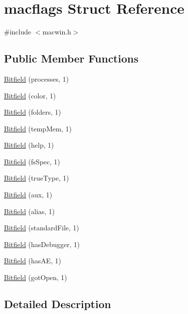 \hypertarget{structmacflags}{\section{macflags Struct Reference}
\label{structmacflags}
}


{\ttfamily \#include $<$macwin.\+h$>$}

\subsection*{Public Member Functions}
\begin{DoxyCompactItemize}
\item 
\hyperlink{structmacflags_a492419e327187a35b685884fd35328bf}{Bitfield} (processes, 1)
\item 
\hyperlink{structmacflags_aa684f1c09cbb235a1252605e7e7455a5}{Bitfield} (color, 1)
\item 
\hyperlink{structmacflags_a704edd2ff63044bccd74392acb1597be}{Bitfield} (folders, 1)
\item 
\hyperlink{structmacflags_acef38b6901759fbbf9a41293096646ca}{Bitfield} (temp\+Mem, 1)
\item 
\hyperlink{structmacflags_ab07089909177f8fc65cb9d87e2c2e085}{Bitfield} (help, 1)
\item 
\hyperlink{structmacflags_a3ef18db3586d2b2d469f1fecd22b5fb1}{Bitfield} (fs\+Spec, 1)
\item 
\hyperlink{structmacflags_ad75aa422c63698f2ca13e5ea43c5bcda}{Bitfield} (true\+Type, 1)
\item 
\hyperlink{structmacflags_ab5cc796c60ccca4386aa88e43ceb62c0}{Bitfield} (aux, 1)
\item 
\hyperlink{structmacflags_a6bb87dc6ce6393dc5c2ee2ad863ed21b}{Bitfield} (alias, 1)
\item 
\hyperlink{structmacflags_a9737f8f2dd606aa94f7575e2cad03d27}{Bitfield} (standard\+File, 1)
\item 
\hyperlink{structmacflags_ac66bb5f10857e0fbd006fffa1b7d30b2}{Bitfield} (has\+Debugger, 1)
\item 
\hyperlink{structmacflags_a65986d24bfedf19e0a515a9698056703}{Bitfield} (has\+A\+E, 1)
\item 
\hyperlink{structmacflags_a123d8b1a19a90b55392f7d762559d229}{Bitfield} (got\+Open, 1)
\end{DoxyCompactItemize}


\subsection{Detailed Description}


